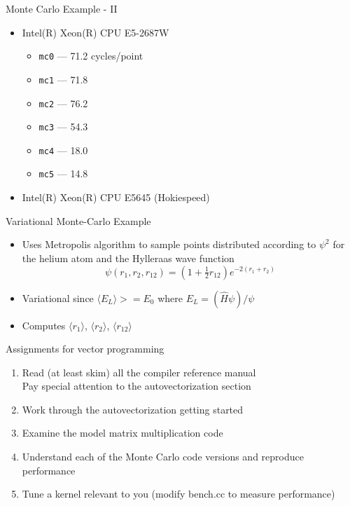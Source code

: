 \begin{frame}[fragile]{Monte Carlo Example - II}
  \begin{itemize}
  \item Intel(R) Xeon(R) CPU E5-2687W
    \begin{itemize}
    \item \verb+mc0+ --- 71.2 cycles/point
    \item \verb+mc1+ --- 71.8
    \item \verb+mc2+ --- 76.2
    \item \verb+mc3+ --- 54.3
    \item \verb+mc4+ --- 18.0
    \item \verb+mc5+ --- 14.8
    \end{itemize}
  \item Intel(R) Xeon(R) CPU E5645 (Hokiespeed)
  \end{itemize}
\end{frame}

\begin{frame}{Variational Monte-Carlo Example}

  \begin{itemize}
  \item Uses Metropolis algorithm to sample points distributed according to $\psi^2$ for the helium atom and the Hylleraas wave function 
\[
\psi(r_1, r_2, r_{12}) = (1 + \tfrac{1}{2} r_{12}) e^{-2 (r_1 + r_2)}
\]
  \item Variational since $\langle E_L \rangle >= E_0$ where $E_L = (\hat{H} \psi)/\psi$
  \item Computes $\langle r_1 \rangle$, $\langle r_2 \rangle$, $\langle r_{12} \rangle$
  \end{itemize}
  
\end{frame}
 
\begin{frame}{Assignments for vector programming}

  \begin{enumerate}
  \item Read (at least skim) all the compiler reference manual \\
  Pay special attention to the autovectorization section
  \item Work through the autovectorization getting started
  \item Examine the model matrix multiplication code
  \item Understand each of the Monte Carlo code versions and reproduce performance
  \item Tune a kernel relevant to you (modify bench.cc to measure performance)
  \end{enumerate}
  
\end{frame}


